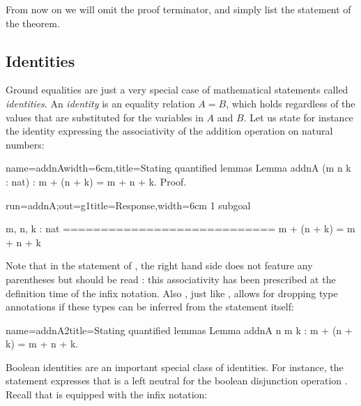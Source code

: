 From now on we will omit the  proof terminator, and
simply list the statement of the theorem.

\subsection{Identities}\label{ssec:id}


Ground equalities are just a very special case of mathematical
statements called \emph{identities}. An \emph{identity} is an equality
relation $A = B$, which holds regardless of the values that are
substituted for the variables in $A$ and $B$.
Let us state for instance the identity expressing the associativity of
the addition operation  on natural numbers:

\begin{coq}{name=addnA}{width=6cm,title=Stating quantified lemmas}
Lemma addnA (m n k : nat) :
  m + (n + k) = m + n + k.
Proof.
\end{coq}
\begin{coqout}{run=addnA;out=g1}{title=Response,width=6cm}
1 subgoal

 m, n, k : nat
 ============================
  m + (n + k) = m + n + k
\end{coqout}

Note that in the statement of , the right hand side does not
feature any parentheses but should be read : this
associativity has been prescribed at the definition time of the infix
\C{+} notation. Also
, just like , allows for
dropping type annotations if these types can be inferred from the
statement itself:

\begin{coq}{name=addnA2}{title=Stating quantified lemmas}
Lemma addnA n m k : m + (n + k) = m + n + k.
\end{coq}


Boolean identities are an important special class of identities. For
instance, the~ statement expresses that  is a left
neutral for the boolean disjunction operation . Recall that
 is equipped with the \C{||} infix notation:

